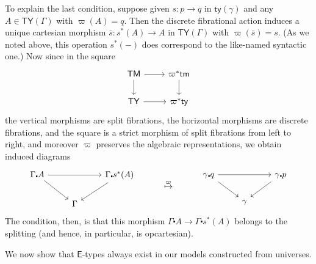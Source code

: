 \documentclass[10pt]{article}
\theoremstyle{definition}
\newcommand\Esym{\ensuremath{\mathsf{E}}}
\newcommand\St[2]{\ensuremath{{#1}^*(#2)}}
\newcommand\Mty{\mathsf{ty}}
\newcommand\Mtm{\mathsf{tm}}
\newcommand\Cty{\mathsf{TY}}
\newcommand\Ctm{\mathsf{TM}}
\newcommand\vp{\varpi}
\newcommand\vpst{\vp^*}
\newcommand\ce{\mathord{\centerdot}}
\begin{document}
To explain the last condition, suppose given $s:p\to q$ in $\Mty(\gamma)$ and any $A\in \Cty(\Gamma)$ with $\vp(A) = q$.
Then the discrete fibrational action induces a unique cartesian morphism $\bar{s}:\St{s}{A} \to A$ in $\Cty(\Gamma)$ with $\vp(\bar{s})=s$.
(As we noted above, this operation $\St{s}{-}$ does correspond to the like-named syntactic one.)
Now since in the square
\[\begin{tikzcd}
    \Ctm \ar[d] \ar[r] & \vpst \Mtm \ar[d] \\
    \Cty \ar[r] & \vpst \Mty
  \end{tikzcd}
\]
the vertical morphisms are split fibrations, the horizontal morphisms are discrete fibrations, and the square is a strict morphism of split fibrations from left to right, and moreover $\vp$ preserves the algebraic representations, we obtain induced diagrams
\[
  \begin{tikzcd}
    \Gamma\ce A \ar[dr] \ar[rr] & & \Gamma\ce \St{s}{A} \ar[dl] \\
    & \Gamma
  \end{tikzcd}
  \hspace{1cm}\overset{\vp}{\mapsto}\hspace{1cm}
  \begin{tikzcd}
    \gamma\ce q \ar[dr] \ar[rr] & & \gamma\ce p \ar[dl] \\
    & \gamma
  \end{tikzcd}
\]
The condition, then, is that this morphism $\Gamma\ce A \to \Gamma\ce \St{s}{A}$ belongs to the splitting (and hence, in particular, is opcartesian).

We now show that $\Esym$-types always exist in our models constructed from universes.
\end{document}
